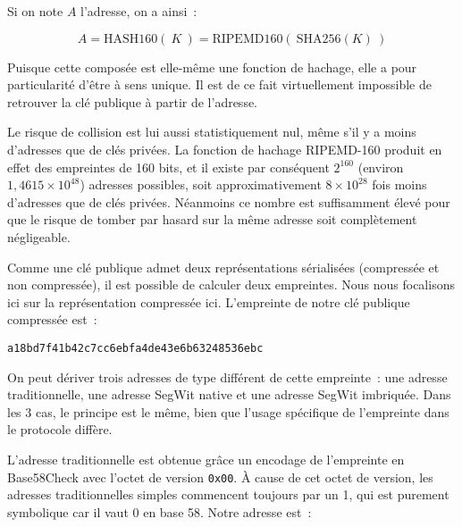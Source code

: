 Si on note $A$ l'adresse, on a ainsi~:

\[
A = \mathrm{HASH160}(~K~) = \mathrm{RIPEMD160}(~\mathrm{SHA256}( K )~)
\]

Puisque cette composée est elle-même une fonction de hachage, elle a pour particularité d'être à sens unique. Il est de ce fait virtuellement impossible de retrouver la clé publique à partir de l'adresse.

Le risque de collision est lui aussi statistiquement nul, même s'il y a moins d'adresses que de clés privées. La fonction de hachage RIPEMD-160 produit en effet des empreintes de 160 bits, et il existe par conséquent $2^{160}$ (environ $1,4615 \times 10^{48}$) adresses possibles, soit approximativement $8 \times 10^{28}$ fois moins d'adresses que de clés privées. Néanmoins ce nombre est suffisamment élevé pour que le risque de tomber par hasard sur la même adresse soit complètement négligeable. 

Comme une clé publique admet deux représentations sérialisées (compressée et non compressée), il est possible de calculer deux empreintes. Nous nous focalisons ici sur la représentation compressée ici. L'empreinte de notre clé publique compressée est~:

\begin{Verbatim}[fontsize=\footnotesize]
a18bd7f41b42c7cc6ebfa4de43e6b63248536ebc
\end{Verbatim}

On peut dériver trois adresses de type différent de cette empreinte~: une adresse traditionnelle, une adresse SegWit native et une adresse SegWit imbriquée. Dans les 3 cas, le principe est le même, bien que l'usage spécifique de l'empreinte dans le protocole diffère.

L'adresse traditionnelle est obtenue grâce un encodage de l'empreinte en Base58Check avec l'octet de version \verb?0x00?. À cause de cet octet de version, les adresses traditionnelles simples commencent toujours par un 1, qui est purement symbolique car il vaut 0 en base 58. Notre adresse est~:

